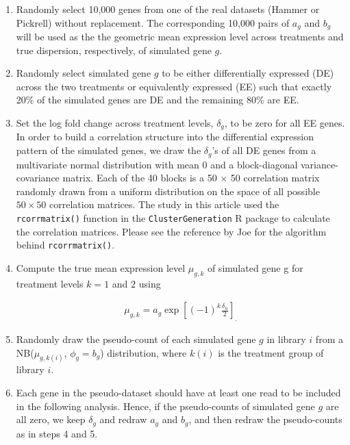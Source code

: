 \documentclass[10pt]{article}
\begin{document}
\begin{enumerate}
\item Randomly select 10,000 genes from one of the real datasets (Hammer or Pickrell) without replacement. The corresponding 10,000 pairs of $a_g$ and $b_g$ will be used as the the geometric mean expression level across treatments and true dispersion, respectively, of simulated gene $g$.
\item Randomly select simulated gene $g$ to be either differentially expressed (DE) across the two treatments or equivalently expressed (EE) such that exactly 20\% of the simulated genes are DE and the remaining 80\% are EE.
\item Set the log fold change across treatment levels, $\delta_g$, to be zero for all EE genes. In order to build a correlation structure into the differential expression pattern of the simulated genes, we draw the $\delta_g$'s of all DE genes from a multivariate normal distribution with mean 0 and a block-diagonal variance-covariance matrix. Each of the 40 blocks is a 50 $\times$ 50 correlation matrix randomly drawn from a uniform distribution on the space of all possible $50 \times 50$ correlation matrices. The study in this article used the {\tt rcorrmatrix()} function in the {\tt ClusterGeneration} R package to calculate the correlation matrices. Please see the reference by Joe \cite{joe} for the algorithm behind {\tt rcorrmatrix()}.

\item Compute the true mean expression level $\mu_{g, k}$ of simulated gene g for treatment levels $k = 1$ and $2$ using

\begin{align*}
\mu_{g, k} = a_g \exp \left [ (-1)^k \frac{\delta_h}{2} \right ]_.
\end{align*}

\item Randomly draw the pseudo-count of each simulated gene $g$ in library $i$ from a NB($\mu_{g, k(i)}$, ${\phi}_{g} = b_g$) distribution, where $k(i)$ is the treatment group of library $i$.
\item Each gene in the pseudo-dataset should have at least one read to be included in the following analysis. Hence, if the pseudo-counts of simulated gene $g$ are all zero, we keep $\delta_g$ and redraw $a_g$ and $b_g$, and then redraw the pseudo-counts as in steps 4 and 5.
\end{enumerate}
\end{document}
